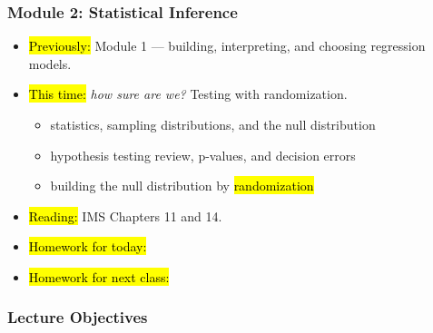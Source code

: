 

\begin{frame}
\frametitle{Module 2: Statistical Inference}
    \begin{itemize}
    \item \hl{Previously:} Module 1 --- building, interpreting, and choosing regression models.
    \item \hl{This time:} \emph{how sure are we?} Testing with randomization.
      \begin{itemize}
      \item statistics, sampling distributions, and the null distribution
      \item hypothesis testing review, p-values, and decision errors
      \item building the null distribution by \hl{randomization}
      \end{itemize}
    \item \hl{Reading:} IMS Chapters 11 and 14.
    \item \hl{Homework for today:}
    \item \hl{Homework for next class:}
    \end{itemize}
\end{frame}


\begin{frame}
    \frametitle{Lecture Objectives}
\end{frame}
